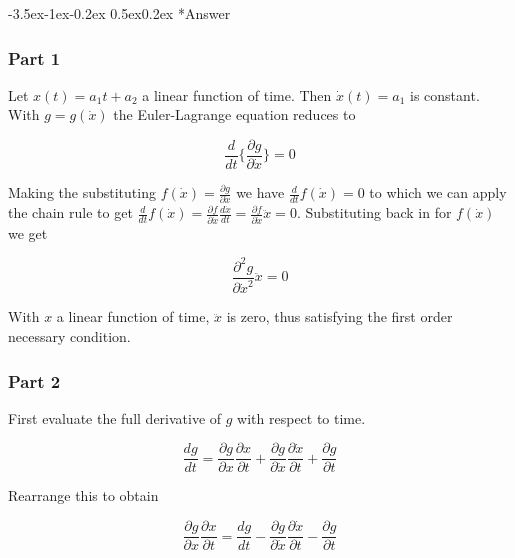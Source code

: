\documentclass[11pt,letterpaper,onecolumn,notitlepage]{article}
\makeatletter
\renewcommand\subsection{\@startsection{subsection}{1}{\z@}%
{-3.5ex\@plus-1ex\@minus-0.2ex}%
{0.5ex\@plus0.2ex}%
{\fontsize{10pt}{10pt}\selectfont\bfseries\sffamily}}
\makeatother
\begin{document}
  \subsection*{Answer}
  \subsubsection*{Part 1}

  Let $x(t)=a_{1}t+a_{2}$ a linear function of time.
  Then $\dot{x}(t)=a_{1}$ is constant.
  With $g=g(\dot{x})$ the Euler-Lagrange equation reduces to

  \begin{equation*}
    \frac{d}{dt}\biggr\{\frac{\partial{}g}{\partial\dot{x}}\biggr\}=0
  \end{equation*}

  Making the substituting $f(\dot{x})=\frac{\partial{}g}{\partial\dot{x}}$ we have $\frac{d}{dt}f(\dot{x})=0$ to which we can apply the chain rule to get $\frac{d}{dt}f(\dot{x})=\frac{\partial{}f}{\partial\dot{x}}\frac{d\dot{x}}{dt}=\frac{\partial{}f}{\partial\dot{x}}\ddot{x}=0$.
  Substituting back in for $f(\dot{x})$ we get

  \begin{equation*}
    \frac{\partial^{2}g}{\partial\dot{x}^{2}}\ddot{x}=0
  \end{equation*}

  With $x$ a linear function of time, $\ddot{x}$ is zero, thus satisfying the first order necessary condition.

  \subsubsection*{Part 2}

  First evaluate the full derivative of $g$ with respect to time.

  \begin{equation*}
    \frac{dg}{dt}=\frac{\partial{}g}{\partial{}x}\frac{\partial{}x}{\partial{}t}+\frac{\partial{}g}{\partial\dot{x}}\frac{\partial\dot{x}}{\partial{}t}+\frac{\partial{}g}{\partial{}t}
  \end{equation*}

  Rearrange this to obtain

  \begin{equation*}
    \frac{\partial{}g}{\partial{}x}\frac{\partial{}x}{\partial{}t}=
    \frac{dg}{dt}-\frac{\partial{}g}{\partial\dot{x}}\frac{\partial\dot{x}}{\partial{}t}-\frac{\partial{}g}{\partial{}t}
  \end{equation*}
\end{document}
